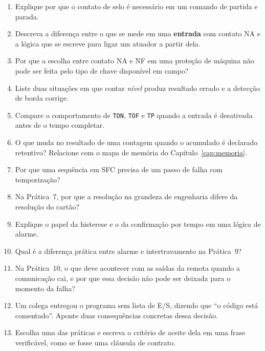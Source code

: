 \begin{exercicios}
\begin{enumerate}[label=\alph*)]
  \item Explique por que o contato de selo é necessário em um comando de partida e parada.
  \item Descreva a diferença entre o que se mede em uma \textbf{entrada} com contato NA e a lógica que
        se escreve para ligar um atuador a partir dela.
  \item Por que a escolha entre contato NA e NF em uma proteção de máquina não pode ser feita pelo
        tipo de chave disponível em campo?
  \item Liste duas situações em que contar \emph{nível} produz resultado errado e a detecção de borda
        corrige.
  \item Compare o comportamento de \texttt{TON}, \texttt{TOF} e \texttt{TP} quando a entrada é
        desativada antes de o tempo completar.
  \item O que muda no resultado de uma contagem quando o acumulado é declarado retentivo? Relacione
        com o mapa de memória do Capítulo~\ref{cap:memoria}.
  \item Por que uma sequência em SFC precisa de um passo de falha com temporização?
  \item Na Prática~7, por que a resolução na grandeza de engenharia difere da resolução do cartão?
  \item Explique o papel da histerese e o da confirmação por tempo em uma lógica de alarme.
  \item Qual é a diferença prática entre alarme e intertravamento na Prática~9?
  \item Na Prática~10, o que deve acontecer com as saídas da remota quando a comunicação cai, e por
        que essa decisão não pode ser deixada para o momento da falha?
  \item Um colega entregou o programa sem lista de E/S, dizendo que ``o código está comentado''.
        Aponte duas consequências concretas dessa decisão.
  \item Escolha uma das práticas e escreva o critério de aceite dela em uma frase verificável, como
        se fosse uma cláusula de contrato.
\end{enumerate}
\end{exercicios}
